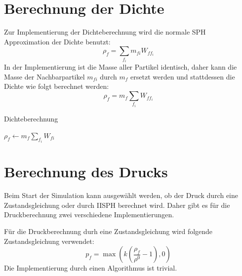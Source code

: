 \documentclass[11pt,
a4paper,
parskip=half, %
BCOR=10mm, %
english,
ngerman]{scrreprt}
\begin{document}
\section{Berechnung der Dichte}
Zur Implementierung der Dichteberechnung wird die normale SPH Approximation der Dichte benutzt:
\begin{equation}
    \rho_f = \sum_{f_i} m_{fi} W_{f f_i}
\end{equation}
In der Implementierung ist die Masse aller Partikel identisch, daher kann die Masse der Nachbarpartikel $m_{fi}$ durch $m_f$ ersetzt werden
und stattdessen die Dichte wie folgt berechnet werden:
\begin{equation}
    \rho_f = m_f \sum_{f_i} W_{f f_i}
\end{equation}

\begin{algorithm}
    \caption{Dichteberechnung}
    \label{alg:density}
    \begin{algorithmic}
            \State $\rho_f \gets m_f \sum_{f_i} W_{fi}$
        \EndFor
    \end{algorithmic}
\end{algorithm}

\section{Berechnung des Drucks}
Beim Start der Simulation kann ausgewählt werden, ob der Druck durch eine Zustandsgleichung oder durch IISPH berechnet wird.
Daher gibt es für die Druckberechnung zwei verschiedene Implementierungen.

Für die Druckberechnung durh eine Zustandsgleichung wird folgende Zustandsgleichung verwendet:
\begin{equation}
    p_f = \max\left(k \left(\frac{\rho_f}{\rho^0} - 1\right), 0\right)
\end{equation}
Die Implementierung durch einen Algorithmus ist trivial.

\end{document}
